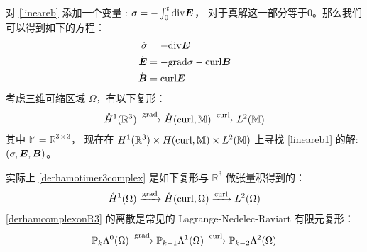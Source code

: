\documentclass[lang=cn,a4paper,newtx]{elegantpaper}
\begin{document}
对 \eqref{lineareb} 添加一个变量 : $\sigma = -\int_{0}^t \mathrm{div} \boldsymbol{E}$，
对于真解这一部分等于0。那么我们可以得到如下的方程：
\begin{equation}
    \label{lineareb1}
    \begin{aligned}
        \dot{\sigma} & = - \mathrm{div} \boldsymbol{E}\\
        \dot{\boldsymbol{E}} &= - \mathrm{grad}{\sigma} - \mathrm{curl} \boldsymbol{B}\\
        \dot{\boldsymbol{B}} & = \mathrm{curl} \boldsymbol{E}
    \end{aligned}
\end{equation}
考虑三维可缩区域 $\Omega$，有以下复形：
\begin{equation}
\label{derhamotimer3complex}
\begin{aligned}
\mathring{H}^1(\mathbb{R}^3) \xrightarrow{\mathrm{grad}} 
\mathring{H}(\mathrm{curl}, \mathbb{M}) \xrightarrow{\mathrm{curl}}
L^2(\mathbb{M})
\end{aligned}
\end{equation}
其中 $\mathbb{M} = \mathbb{R}^{3\times 3}$，
现在在 $H^1(\mathbb{R}^3) \times H(\mathrm{curl}, \mathbb{M}) \times L^2(\mathbb{M})$
上寻找 \eqref{lineareb1} 的解: $(\sigma, \boldsymbol{E}, \boldsymbol{B})$。

实际上 \eqref{derhamotimer3complex} 是如下复形与
$\mathbb{R}^3$ 做张量积得到的：
\begin{equation}
\label{derhamcomplexonR3}
\begin{aligned}
\mathring{H}^1(\Omega) \xrightarrow{\mathrm{grad}}
\mathring{H}(\mathrm{curl}, \Omega) \xrightarrow{\mathrm{curl}}
L^2(\Omega)
\end{aligned}
\end{equation}
\eqref{derhamcomplexonR3} 的离散是常见的 Lagrange-Nedelec-Raviart
有限元复形：
\begin{equation}
\label{derhamcomplexonR3discrete}
\begin{aligned}
    \mathbb{P}_{k}\Lambda^0(\Omega) \xrightarrow{\mathrm{grad}}
    \mathbb{P}_{k-1}\Lambda^1(\Omega) \xrightarrow{\mathrm{curl}}
    \mathbb{P}_{k-2}\Lambda^2(\Omega)
\end{aligned}
\end{equation}
\end{document}
